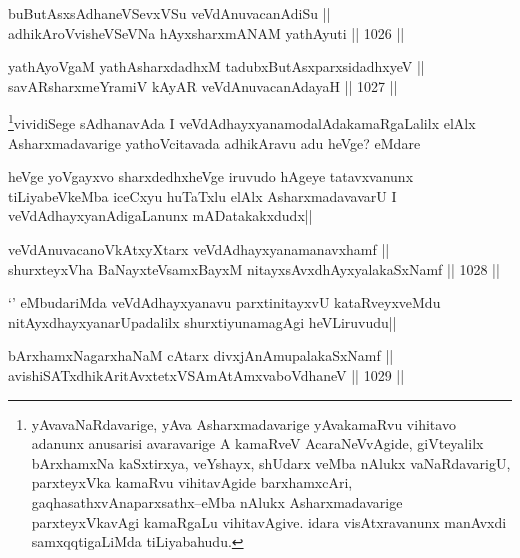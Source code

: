 \begin{shl}
buButAsxsAdhaneVSevxVSu veVdAnuvacanAdiSu || \\
adhikAroV\s visheVSeVNa hAyxsharxmANAM yathAyuti ||  1026 ||  
\end{shl}

\begin{shl}
yathAyoVgaM yathAsharxdadhxM tadubxButAsxparxsidadhxyeV || \\
savARsharxmeYramiV kAyAR veVdAnuvacanAdayaH ||  1027 ||  
\end{shl}

\begin{artha}
\footnote{yAvavaNaRdavarige, yAva Asharxmadavarige yAvakamaRvu vihitavo adanunx anusarisi avaravarige A kamaRveV AcaraNeVvAgide, giVteyalilx bArxhamxNa kaSxtirxya, veYshayx, shUdarx veMba nAlukx vaNaRdavarigU, parxteyxVka kamaRvu vihitavAgide barxhamxcAri, gaqhasathxvAnaparxsathx--eMba nAlukx Asharxmadavarige parxteyxVkavAgi kamaRgaLu vihitavAgive. idara visAtxravanunx manAvxdi samxqqtigaLiMda tiLiyabahudu.}vividiSege sAdhanavAda I veVdAdhayxyanamodalAdakamaRgaLalilx elAlx Asharxmadavarige yathoVcitavada adhikAravu adu heVge? eMdare
\end{artha}

\begin{artha}
heVge yoVgayxvo sharxdedhxheVge iruvudo hAgeye tatavxvanunx tiLiyabeVkeMba iceCxyu huTaTxlu elAlx AsharxmadavavarU I veVdAdhayxyanAdigaLanunx mADatakakxdudx||
\end{artha}


\begin{shl}
veVdAnuvacanoVkAtxyX\s tarx veVdAdhayxyanamanavxhamf || \\
shurxteyxVha BaNayxteV\s samxBayxM nitayxsAvxdhAyxyalakaSxNamf ||  1028 ||  
\end{shl}

\begin{artha}
`\stext' eMbudariMda veVdAdhayxyanavu parxtinitayxvU kataRveyxveMdu nitAyxdhayxyanarUpadalilx shurxtiyunamagAgi heVLiruvudu||
\end{artha}


\begin{shl}
bArxhamxNagarxhaNaM cAtarx divxjAnAmupalakaSxNamf || \\
avishiSATxdhikAritAvxtetxVSAmAtAmxvaboVdhaneV ||  1029 ||  
\end{shl}

